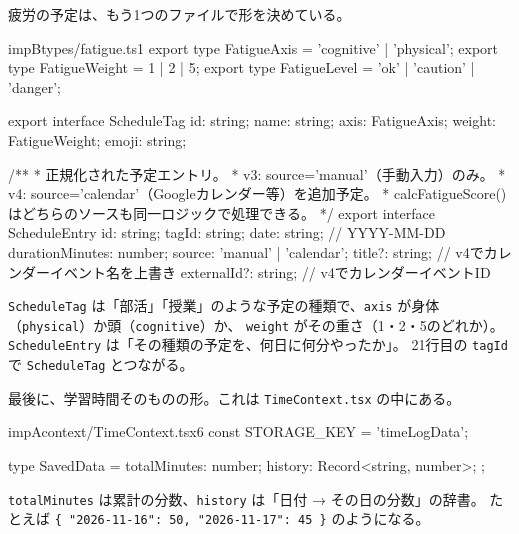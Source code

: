 疲労の予定は、もう1つのファイルで形を決めている。

\begin{codebox}{impB}{types/fatigue.ts}{1}
export type FatigueAxis = 'cognitive' | 'physical';
export type FatigueWeight = 1 | 2 | 5;
export type FatigueLevel = 'ok' | 'caution' | 'danger';

export interface ScheduleTag {
  id: string;
  name: string;
  axis: FatigueAxis;
  weight: FatigueWeight;
  emoji: string;
}

/**
 * 正規化された予定エントリ。
 * v3: source='manual'（手動入力）のみ。
 * v4: source='calendar'（Googleカレンダー等）を追加予定。
 * calcFatigueScore() はどちらのソースも同一ロジックで処理できる。
 */
export interface ScheduleEntry {
  id: string;
  tagId: string;
  date: string; // YYYY-MM-DD
  durationMinutes: number;
  source: 'manual' | 'calendar';
  title?: string; // v4でカレンダーイベント名を上書き
  externalId?: string; // v4でカレンダーイベントID
}
\end{codebox}

\texttt{ScheduleTag} は「部活」「授業」のような予定の種類で、\texttt{axis} が身体（\texttt{physical}）か頭（\texttt{cognitive}）か、
\texttt{weight} がその重さ（1・2・5のどれか）。\texttt{ScheduleEntry} は「その種類の予定を、何日に何分やったか」。
21行目の \texttt{tagId} で \texttt{ScheduleTag} とつながる。

最後に、学習時間そのものの形。これは \texttt{TimeContext.tsx} の中にある。

\begin{codebox}{impA}{context/TimeContext.tsx}{6}
const STORAGE_KEY = 'timeLogData';

type SavedData = {
  totalMinutes: number;
  history: Record<string, number>;
};
\end{codebox}

\texttt{totalMinutes} は累計の分数、\texttt{history} は「日付 → その日の分数」の辞書。
たとえば \texttt{\{ "2026-11-16": 50, "2026-11-17": 45 \}} のようになる。


